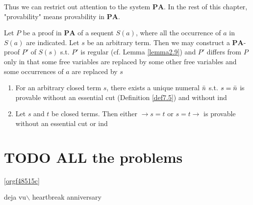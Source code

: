\documentclass[11pt]{article}
\def \PA {\textbf{PA}}
\begin{document}
Thus we can restrict out attention to the system \(\PA\). In the rest of this chapter,
"provability" means provability in \(\PA\).

\begin{proposition}[]
Let \(P\) be a proof in \(\PA\) of a sequent \(S(a)\), where all the occurrence of \(a\)
in \(S(a)\) are indicated. Let \(s\) be an arbitrary term. Then we may construct
a \(\PA\)-proof \(P'\) of \(S(s)\) s.t. \(P'\) is regular (cf. Lemma \ref{lemma2.9}) and \(P'\)
differs from \(P\) only in that some free variables are replaced by some other free variables and
some occurrences of \(a\) are replaced by \(s\)
\end{proposition}

\begin{lemma}[]
\label{lemma9.6}
\begin{enumerate}
\item For an arbitrary closed term \(s\), there exists a unique numeral \(\bar{n}\) s.t. \(s=\bar{n}\)
is provable without an essential cut (Definition \ref{def7.5}) and without ind
\item Let \(s\) and \(t\) be closed terms. Then either \(\to s=t\) or \(s=t\to\) is provable without
an essential cut or ind
\end{enumerate}
\end{lemma}



\section{{\bfseries\sffamily TODO} ALL the problems}
\label{sec:orgc599ddc}

\ref{orgf48515c}


deja vu$\backslash$ heartbreak anniversary
\end{document}
